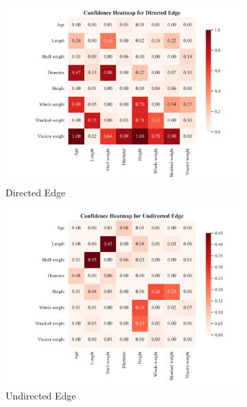 \documentclass{article}
\begin{document}
\begin{figure}[H]
    \centering
    \begin{subfigure}{0.32\textwidth}
        \centering
        \includegraphics[width=\linewidth]{./demo_data/20241104_111650/Abalone/output_graph/certain_edges_confidence_heatmap.jpg}
        \caption{Directed Edge}
    \end{subfigure}
    \begin{subfigure}{0.32\textwidth}
        \centering
        \includegraphics[width=\linewidth]{./demo_data/20241104_111650/Abalone/output_graph/uncertain_edges_confidence_heatmap.jpg}
        \caption{Undirected Edge}
    \end{subfigure}
    \begin{subfigure}{0.32\textwidth}

\end{subfigure}
\end{figure}
\end{document}
